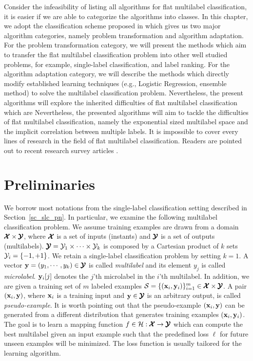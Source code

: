 {Consider the infeasibility of listing all algorithms for flat multilabel classification, it is easier if we are able to categorize the algorithms into classes.
In this chapter, we adopt the classification scheme proposed in \citep{Tsoumakas07multi,Tsoumakas10mining} which gives us two major algorithm categories, namely problem transformation and algorithm adaptation.
For the problem transformation category, we will present the methods which aim to transfer the flat multilabel classification problem into other well studied problems, for example, single-label classification, and label ranking.
For the algorithm adaptation category, we will describe the methods which directly modify established learning techniques (e.g., Logistic Regression, ensemble method) to solve the multilabel classification problem.
Nevertheless, the present algorithms will explore the inherited difficulties of flat multilabel classification which are 
Nevertheless, the presented algorithms will aim to tackle the difficulties of flat multilabel classification, namely the exponential sized multilabel space and the implicit correlation between multiple labels.
It is impossible to cover every lines of research in the field of flat multilabel classification.
Readers are pointed out to recent research survey articles \citep{Tsoumakas07multi,Tsoumakas10mining,Zhang14a}.



\section{Preliminaries} \label{sc_mlc_pn}

We borrow most notations from the single-label classification setting described in Section~\ref{sc_slc_pn}.
In particular, we examine the following {multilabel classification} problem.
We assume training examples are drawn from a domain $\pmb {\mathcal{X}}\times\pmb {\mathcal{Y}}$, where $\pmb {\mathcal{X}}$ is a set of inputs (instants) and $\pmb {\mathcal{Y}}$ is a set of outputs (multilabels).
$\pmb {\mathcal{Y}} = \mathcal{Y}_1\times\cdots\times\mathcal{Y}_k$ is composed by a Cartesian product of $k$ sets $\mathcal{Y}_i=\{-1,+1\}$.
We retain a single-label classification problem by setting $k=1$.
A vector $\mathbf {y}=(y_1,\cdots,y_k)\in\pmb {\mathcal{Y}}$ is called \textit{multilabel} and its element $y_j$ is called \textit{microlabel}.
$\mathbf {y}_i[j]$ denotes the $j$'th microlabel in the $i$'th multilabel.
In addition, we are given a training set of $m$ labeled examples $\mathcal{S}=\{(\mathbf {x}_i,\mathbf {y}_i)\}_{i=1}^{m}\in\pmb {\mathcal{X}}\times\pmb {\mathcal{Y}}$. 
A pair $(\mathbf {x}_i,\mathbf {y})$, where $\mathbf {x}_i$ is a training input and $\mathbf {y}\in\pmb {\mathcal{Y}}$ is an arbitrary output, is called \textit{pseudo-example}.
It is worth pointing out that the pseudo-example $(\mathbf {x}_i,\mathbf {y})$ can be generated from a different distribution that generates training examples $(\mathbf {x}_i,\mathbf {y}_i)$.
The goal is to learn a mapping function $f\in\mathcal{H}:\pmb {\mathcal{X}}\rightarrow\pmb {\mathcal{Y}}$ which can compute the best multilabel given an input example such that the predefined loss $\ell$ for future unseen examples will be minimized.
The loss function is usually tailored for the learning algorithm.



}
